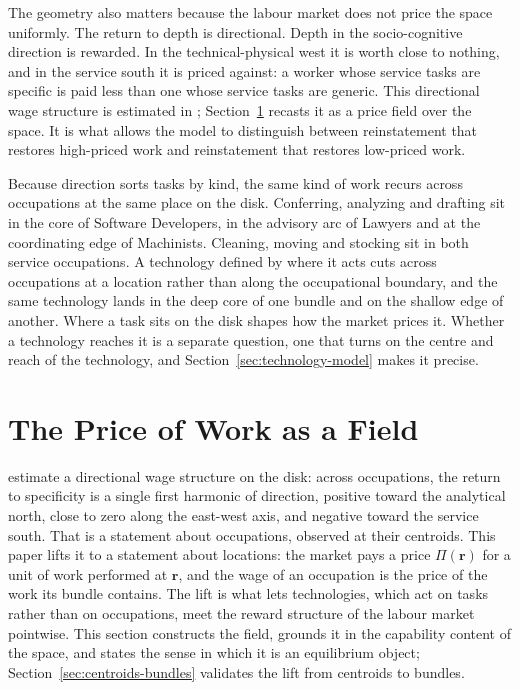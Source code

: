 \documentclass[12pt, a4paper]{article}
\begin{document}
The geometry also matters because the labour market does not price the
space uniformly. The return to depth is directional. Depth in the
socio-cognitive direction is rewarded. In the technical-physical west it
is worth close to nothing, and in the service south it is priced
against: a worker whose service tasks are specific is paid less than one
whose service tasks are generic. This directional wage
structure is estimated in \textcite{storck2026geometry}; Section~\ref{sec:price-field}
recasts it as a price field over the space. It is what allows the model to
distinguish between reinstatement that restores high-priced work and
reinstatement that restores low-priced work.

Because direction sorts tasks by kind, the same kind of work recurs
across occupations at the same place on the disk. Conferring, analyzing
and drafting sit in the core of Software Developers, in the advisory arc
of Lawyers and at the coordinating edge of Machinists. Cleaning, moving
and stocking sit in both service occupations. A technology defined by
where it acts cuts across occupations at a location rather than along the
occupational boundary, and the same technology lands in the deep core of
one bundle and on the shallow edge of another. Where a task sits on the
disk shapes how the market prices it. Whether a technology reaches it is a
separate question, one that turns on the centre and reach of the
technology, and Section~\ref{sec:technology-model} makes it precise.


\section{The Price of Work as a Field}
\label{sec:price-field}

\textcite{storck2026geometry} estimate a directional wage structure on
the disk: across occupations, the return to specificity is a single
first harmonic of direction, positive toward the analytical north, close
to zero along the east-west axis, and negative toward the service south.
That is a statement about
occupations, observed at their centroids. This paper lifts it to a
statement about locations: the market pays a price $\Pi(\mathbf{r})$
for a unit of work performed at $\mathbf{r}$, and the wage of an
occupation is the price of the work its bundle contains. The lift is
what lets technologies, which act on tasks rather than on occupations,
meet the reward structure of the labour market pointwise. This section
constructs the field, grounds it in the capability content of the
space, and states the sense in which it is an equilibrium object;
Section~\ref{sec:centroids-bundles} validates the lift from centroids
to bundles.
\end{document}
